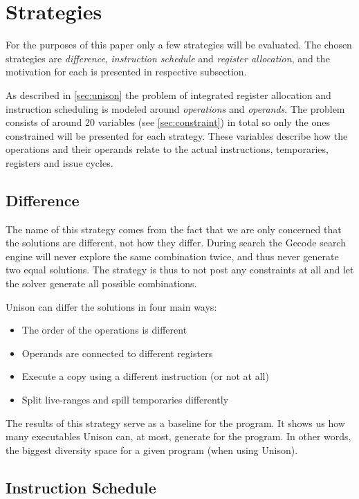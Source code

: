 \section{Strategies}

For the purposes of this paper only a few strategies will be evaluated. The chosen
strategies are \textit{difference}, \textit{instruction schedule} and
\textit{register allocation}, and the motivation for each is presented in respective
subsection.

As described in \ref{sec:unison} the problem of integrated register allocation and
instruction scheduling is modeled around \textit{operations} and \textit{operands}. The
problem consists of around 20 variables (see \ref{sec:constraint}) in total so only the
ones constrained will be presented for each strategy. These variables describe how the
operations and their operands relate to the actual instructions, temporaries, registers
and issue cycles.



\subsection{Difference}

The name of this strategy comes from the fact that we are only concerned that the solutions
are different, not how they differ. During search the Gecode search engine will never
explore the same combination twice, and thus never generate two equal solutions. The
strategy is thus to not post any constraints at all and let the solver generate all
possible combinations.

Unison can differ the solutions in four main ways:

\begin{itemize}
	\item The order of the operations is different
	\item Operands are connected to different registers
	\item Execute a copy using a different instruction (or not at all)
	\item Split live-ranges and spill temporaries differently
\end{itemize}

The results of this strategy serve as a baseline for the program. It shows us how many
executables Unison can, at most, generate for the program. In other words, the biggest
diversity space for a given program (when using Unison).

\subsection{Instruction Schedule}

